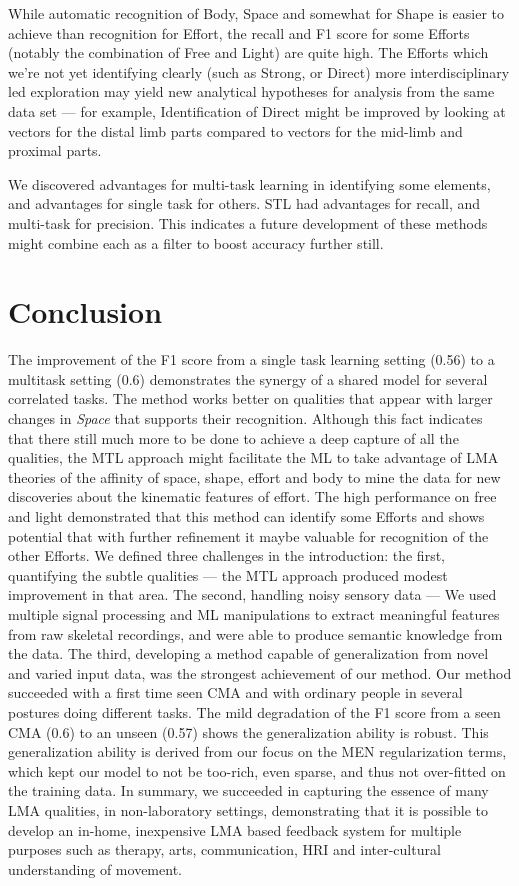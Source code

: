 \documentclass{sigchi}
\begin{document}
While automatic recognition of Body, Space and somewhat for Shape is easier to achieve than recognition for Effort, the recall and F1 score for some Efforts (notably the combination of Free and Light) are quite high.  The Efforts which we're not yet identifying clearly (such as Strong, or Direct) more interdisciplinary led exploration may yield new analytical hypotheses for analysis from the same data set --- for example,  Identification of Direct might be improved by looking at vectors for the distal limb parts compared to vectors for the mid-limb and proximal parts. 

We discovered advantages for multi-task learning in identifying some elements, and advantages for single task for others. STL had advantages for recall, and multi-task for precision. This indicates a future development of these methods might combine each as a filter to boost accuracy further still.

\section{Conclusion}
The improvement of the F1 score from a single task learning setting (0.56) to a multitask setting (0.6) demonstrates the synergy of a shared model for several correlated tasks. 
The method works better on qualities that appear with larger changes in \textit{Space} that supports their recognition. 
Although this fact indicates that there still much more to be done to achieve a deep capture of all the qualities, the MTL approach might facilitate the ML to take advantage of LMA theories of the affinity of space, shape, effort and body to mine the data for new discoveries about the kinematic features of effort.  
The high performance on free and light demonstrated that this method can identify some Efforts and shows potential that with further refinement it maybe valuable for recognition of the other Efforts. 
We defined  three challenges in the introduction: the first, quantifying the subtle qualities --- 
the MTL approach produced modest improvement in that area.
The second, handling noisy sensory data --- We used multiple signal processing and ML manipulations to extract meaningful features from raw skeletal recordings, and were able to produce semantic knowledge from the data. 
The third, developing a method capable  of generalization from novel and varied input data, was the strongest achievement of our method. Our method succeeded with a first time seen CMA and with ordinary people in several postures doing different tasks. 
The mild degradation of the F1 score from a seen CMA (0.6) to an unseen (0.57) shows the generalization ability is robust.
This generalization ability is derived from our focus on the MEN regularization terms, which kept our model to not be too-rich, even sparse, and thus not over-fitted on the training data.
In summary, we succeeded in capturing the essence of many LMA qualities, in non-laboratory settings, demonstrating that it is possible to develop an in-home, inexpensive LMA based feedback system for multiple purposes such as therapy, arts, communication, HRI and inter-cultural understanding of movement.


\end{document}
